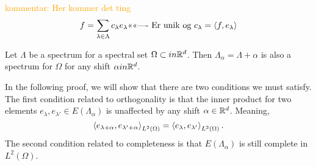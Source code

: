 \documentclass[../thesis.tex]{subfiles}
\begin{document}
\textcolor{orange}{kommentar: Her kommer det ting}
\begin{equation*}
    f = \sum_{\lambda \in \Lambda} c_\lambda e_\lambda \text{<<<<----  Er unik og } c_\lambda = \langle f,e_\lambda\rangle
\end{equation*}


\begin{lemma}
    Let $\Lambda$ be a spectrum for a spectral set $\Omega \subset in \mathbb{R}^d$. Then $\Lambda_\alpha = \Lambda + \alpha$ is also a spectrum for $\Omega$ for any shift $\alpha in\mathbb{R}^d$.
\end{lemma}

In the following proof, we will show that there are two conditions we must satisfy. The first condition related to orthogonality is that the inner product for two elements $e_{\lambda},e_{\lambda'} \in E(\Lambda_\alpha)$ is unaffected by any shift $\alpha \in \mathbb{R}^d$. Meaning,
\begin{equation}
    \left \langle e_{\lambda+\alpha},e_{\lambda'+\alpha} \right \rangle_{L^2(\Omega)} = \left \langle e_{\lambda},e_{\lambda'} \right \rangle_{L^2(\Omega)}.
\end{equation}
The second condition related to completeness is that $E(\Lambda_\alpha)$ is still complete in $L^2(\Omega)$.
\end{document}
